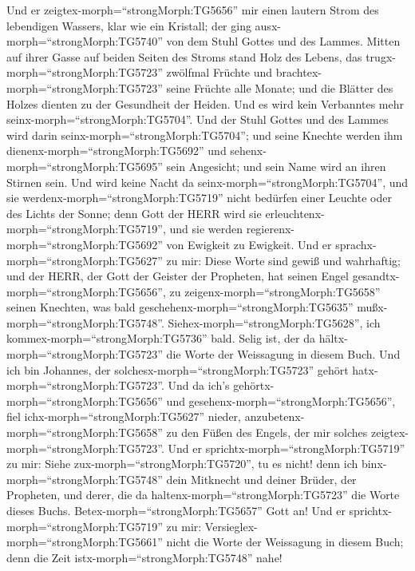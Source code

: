  Und er zeigtex-morph=``strongMorph:TG5656'' mir einen
lautern Strom des lebendigen Wassers, klar wie ein Kristall; der ging
ausx-morph=``strongMorph:TG5740'' von dem Stuhl Gottes und des Lammes.
 Mitten auf ihrer Gasse auf beiden Seiten des Stroms stand
Holz des Lebens, das trugx-morph=``strongMorph:TG5723'' zwölfmal Früchte
und brachtex-morph=``strongMorph:TG5723'' seine Früchte alle Monate; und
die Blätter des Holzes dienten zu der Gesundheit der Heiden.
 Und es wird kein Verbanntes mehr
seinx-morph=``strongMorph:TG5704''. Und der Stuhl Gottes und des Lammes
wird darin seinx-morph=``strongMorph:TG5704''; und seine Knechte werden
ihm dienenx-morph=``strongMorph:TG5692''  und
sehenx-morph=``strongMorph:TG5695'' sein Angesicht; und sein Name wird
an ihren Stirnen sein.  Und wird keine Nacht da
seinx-morph=``strongMorph:TG5704'', und sie
werdenx-morph=``strongMorph:TG5719'' nicht bedürfen einer Leuchte oder
des Lichts der Sonne; denn Gott der HERR wird sie
erleuchtenx-morph=``strongMorph:TG5719'', und sie werden
regierenx-morph=``strongMorph:TG5692'' von Ewigkeit zu Ewigkeit.
 Und er sprachx-morph=``strongMorph:TG5627'' zu mir: Diese
Worte sind gewiß und wahrhaftig; und der HERR, der Gott der Geister der
Propheten, hat seinen Engel gesandtx-morph=``strongMorph:TG5656'', zu
zeigenx-morph=``strongMorph:TG5658'' seinen Knechten, was bald
geschehenx-morph=``strongMorph:TG5635''
mußx-morph=``strongMorph:TG5748''. 
Siehex-morph=``strongMorph:TG5628'', ich
kommex-morph=``strongMorph:TG5736'' bald. Selig ist, der da
hältx-morph=``strongMorph:TG5723'' die Worte der Weissagung in diesem
Buch.  Und ich bin Johannes, der
solchesx-morph=``strongMorph:TG5723'' gehört
hatx-morph=``strongMorph:TG5723''. Und da ich's
gehörtx-morph=``strongMorph:TG5656'' und
gesehenx-morph=``strongMorph:TG5656'', fiel
ichx-morph=``strongMorph:TG5627'' nieder,
anzubetenx-morph=``strongMorph:TG5658'' zu den Füßen des Engels, der mir
solches zeigtex-morph=``strongMorph:TG5723''.  Und er
sprichtx-morph=``strongMorph:TG5719'' zu mir: Siehe
zux-morph=``strongMorph:TG5720'', tu es nicht! denn ich
binx-morph=``strongMorph:TG5748'' dein Mitknecht und deiner Brüder, der
Propheten, und derer, die da haltenx-morph=``strongMorph:TG5723'' die
Worte dieses Buchs. Betex-morph=``strongMorph:TG5657'' Gott an!
 Und er sprichtx-morph=``strongMorph:TG5719'' zu mir:
Versieglex-morph=``strongMorph:TG5661'' nicht die Worte der Weissagung
in diesem Buch; denn die Zeit istx-morph=``strongMorph:TG5748'' nahe!
